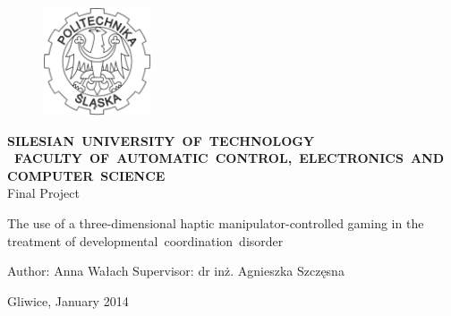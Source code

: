 \begin{titlepage}
\thispagestyle{empty}
\begin{center}
\begin{figure}
\center
\vspace{1cm}
\includegraphics[width=3.2cm]{Images/polsl}
\vspace{1cm}
\end{figure}

\center
\textbf{ \LARGE{}S\Large{}ILESIAN~\LARGE{}U\Large{}NIVERSITY~\LARGE{}O\Large{}F~\LARGE{}T\Large{}ECHNOLOGY \\}
\textbf{ \
\LARGE{}F\Large{}ACULTY~\LARGE{}O\Large{}F~\LARGE{}A\Large{}UTOMATIC~\LARGE{}C\Large{}ONTROL,~\LARGE{}E\Large{}LECTRONICS~AND~\\\LARGE{}C\Large{}OMPUTER~\LARGE{}S\Large{}CIENCE \\
}
\huge
\vspace{4cm}
Final Project

\vspace{1.5cm}
\LARGE
The use of a three-dimensional haptic manipulator-controlled gaming in the treatment of developmental~coordination~disorder
\end{center}

\vspace{2.5cm}
\Large
\noindent
Author: Anna Wałach 
Supervisor: dr inż. Agnieszka Szczęsna

\vspace{2cm}
\large
\noindent
\center
Gliwice, January 2014

\clearpage
\thispagestyle{empty}
\phantom{a}
\mbox{}
\clearpage
\end{titlepage}
